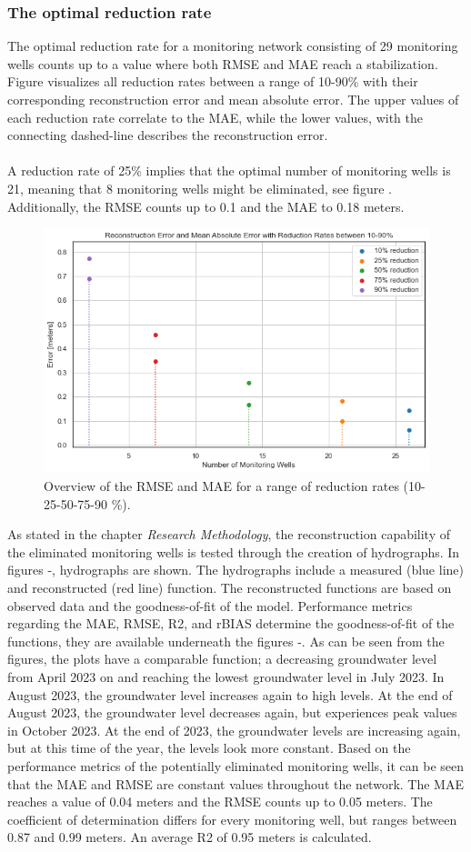 \subsubsection{The optimal reduction rate}
The optimal reduction rate for a monitoring network consisting of 29 monitoring wells counts up to a value where both RMSE and MAE reach a stabilization. Figure  visualizes all reduction rates between a range of 10-90\% with their corresponding reconstruction error and mean absolute error. The upper values of each reduction rate correlate to the MAE, while the lower values, with the connecting dashed-line describes the reconstruction error. \\
\\
A reduction rate of 25\% implies that the optimal number of monitoring wells is 21, meaning that 8 monitoring wells might be eliminated, see figure . Additionally, the RMSE counts up to 0.1 and the MAE to 0.18 meters. 
\begin{figure}[htbp]
    \centering
    \includegraphics[width=0.5\linewidth]{frontmatter/Rozenburg-fig/errorroz.png}
    \caption{Overview of the RMSE and MAE for a range of reduction rates (10-25-50-75-90 \%). }
    \label{rmse}
\end{figure}
As stated in the chapter \textit{Research Methodology}, the reconstruction capability of the eliminated monitoring wells is tested through the creation of hydrographs. In figures -, hydrographs are shown. The hydrographs include a measured (blue line) and reconstructed (red line) function. The reconstructed functions are based on observed data and the goodness-of-fit of the model. Performance metrics regarding the MAE, RMSE, R2, and rBIAS determine the goodness-of-fit of the functions, they are available underneath the figures -. 
\newpage
As can be seen from the figures, the plots have a comparable function; a decreasing groundwater level from April 2023 on and reaching the lowest groundwater level in July 2023. In August 2023, the groundwater level increases again to high levels. At the end of August 2023, the groundwater level decreases again, but experiences peak values in October 2023. At the end of 2023, the groundwater levels are increasing again, but at this time of the year, the levels look more constant. Based on the performance metrics of the potentially eliminated monitoring wells, it can be seen that the MAE and RMSE are constant values throughout the network. The MAE reaches a value of 0.04 meters and the RMSE counts up to 0.05 meters. The coefficient of determination differs for every monitoring well, but ranges between 0.87 and 0.99 meters. An average R2 of 0.95 meters is calculated.


